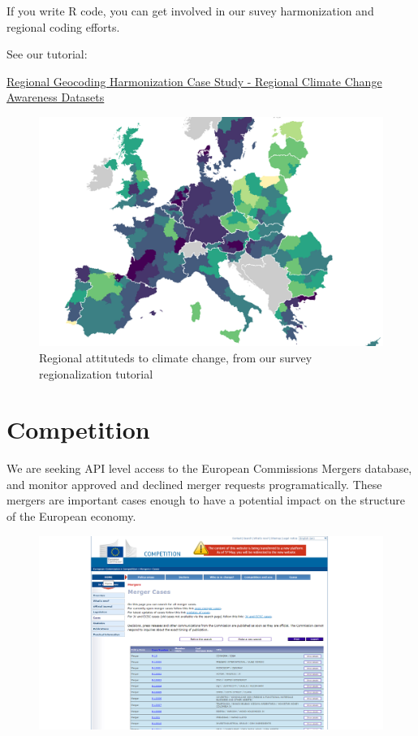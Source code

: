 \documentclass[
  a4paper,
  openany, a4paper, oneside]{book}
\begin{document}
If you write R code, you can get involved in our suvey harmonization and regional coding efforts.

See our tutorial:

\href{http://greendeal.dataobservatory.eu/post/2021-03-06-regions-climate/}{Regional Geocoding Harmonization Case Study - Regional Climate Change Awareness Datasets}

\begin{figure}

{\centering \includegraphics[width=0.67\linewidth]{plots/eurobarometer_climate_attitude_tutorial} 

}

\caption{Regional attituteds to climate change, from our survey regionalization tutorial}\label{fig:regional-climate-attitutes-tutorial-2}
\end{figure}

\hypertarget{compeition-indicators}{%
\section{Competition}\label{compeition-indicators}}

We are seeking API level access to the European Commissions Mergers database, and monitor approved and declined merger requests programatically. These mergers are important cases enough to have a potential impact on the structure of the European economy.

\begin{figure}

{\centering \includegraphics[width=0.8\linewidth]{plots/screenshots/ec_competition_merger_screenshot} 

}

\end{figure}
\end{document}
